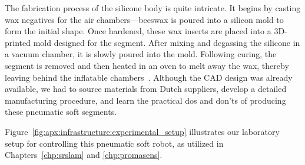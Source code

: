 The fabrication process of the silicone body is quite intricate. It begins by casting wax negatives for the air chambers—beeswax is poured into a silicon mold to form the initial shape. Once hardened, these wax inserts are placed into a 3D-printed mold designed for the segment. After mixing and degassing the silicone in a vacuum chamber, it is slowly poured into the mold. Following curing, the segment is removed and then heated in an oven to melt away the wax, thereby leaving behind the inflatable chambers~\citep{marchese2015recipe}. Although the CAD design was already available, we had to source materials from Dutch suppliers, develop a detailed manufacturing procedure, and learn the practical dos and don’ts of producing these pneumatic soft segments.

Figure~\ref{fig:apx:infrastructure:experimental_setup} illustrates our laboratory setup for controlling this pneumatic soft robot, as utilized in Chapters~\ref{chp:srslam} and \ref{chp:promasens}.

